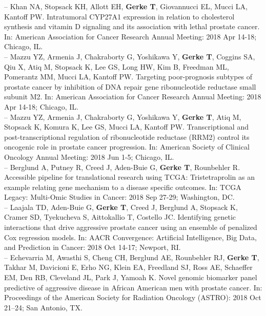 \documentclass[11pt, a4paper]{article} %
\begin{document}
-- Khan NA, Stopsack KH, Allott EH, {\bf Gerke T}, Giovannucci EL, Mucci LA, Kantoff PW. Intratumoral CYP27A1 expression in relation to cholesterol synthesis and vitamin D signaling and its association with lethal prostate cancer. In: American Association for Cancer Research Annual Meeting: 2018 Apr 14-18; Chicago, IL.\\

-- Mazzu YZ, Armenia J, Chakraborty G, Yoshikawa Y, {\bf Gerke T}, Coggins SA, Qiu X, Atiq M, Stopsack K, Lee GS, Long HW, Kim B, Freedman ML, Pomerantz MM, Mucci LA, Kantoff PW. Targeting poor-prognosis subtypes of prostate cancer by inhibition of DNA repair gene ribonucleotide reductase small subunit M2. In: American Association for Cancer Research Annual Meeting: 2018 Apr 14-18; Chicago, IL.\\

-- Mazzu YZ, Armenia J, Chakraborty G, Yoshikawa Y, {\bf Gerke T}, Atiq M, Stopsack K, Komura K, Lee GS, Mucci LA, Kantoff PW. Transcriptional and post-transcriptional regulation of ribonucleotide reductase (RRM2) control its oncogenic role in prostate cancer progression. In: American Society of Clinical Oncology Annual Meeting: 2018 Jun 1-5; Chicago, IL.\\

-- Berglund A, Putney R, Creed J, Aden-Buie G, {\bf Gerke T}, Rounbehler R. Accessible pipeline for translational research using TCGA: Tristetraprolin as an example relating gene mechanism to a disease specific outcomes. In: TCGA Legacy: Multi-Omic Studies in Cancer: 2018 Sep 27-29; Washington, DC.\\

-- Laajala TD, Aden-Buie G, {\bf Gerke T}, Creed J, Berglund A, Stopsack K, Cramer SD, Tyekucheva S, Aittokallio T, Costello JC. Identifying genetic interactions that drive aggressive prostate cancer using an ensemble of penalized Cox regression models.  In: AACR Convergence: Artificial Intelligence, Big Data, and Prediction in Cancer: 2018 Oct 14-17; Newport, RI.\\

-- Echevarria M, Awasthi S, Cheng CH, Berglund AE, Rounbehler RJ, {\bf Gerke T}, Takhar M, Davicioni E, Erho NG, Klein EA, Freedland SJ, Ross AE, Schaeffer EM, Den RB, Cleveland JL, Park J, Yamoah K. Novel genomic biomarker panel predictive of aggressive disease in African American men with prostate cancer. In: Proceedings of the American Society for Radiation Oncology (ASTRO): 2018 Oct 21--24; San Antonio, TX.\\
\end{document}
